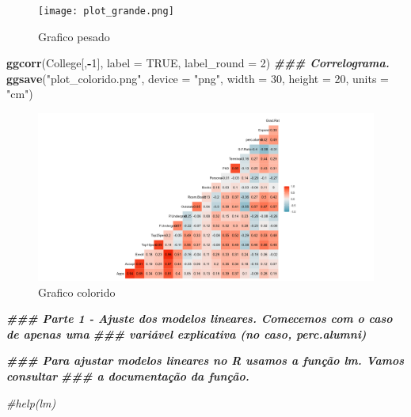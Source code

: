 \documentclass[
]{article}
\newenvironment{Shaded}{\begin{snugshade}}{\end{snugshade}}
\newcommand{\AttributeTok}[1]{\textcolor[rgb]{0.13,0.29,0.53}{#1}}
\newcommand{\CommentTok}[1]{\textcolor[rgb]{0.56,0.35,0.01}{\textit{#1}}}
\newcommand{\ConstantTok}[1]{\textcolor[rgb]{0.56,0.35,0.01}{#1}}
\newcommand{\DecValTok}[1]{\textcolor[rgb]{0.00,0.00,0.81}{#1}}
\newcommand{\DocumentationTok}[1]{\textcolor[rgb]{0.56,0.35,0.01}{\textbf{\textit{#1}}}}
\newcommand{\FunctionTok}[1]{\textcolor[rgb]{0.13,0.29,0.53}{\textbf{#1}}}
\newcommand{\NormalTok}[1]{#1}
\newcommand{\SpecialCharTok}[1]{\textcolor[rgb]{0.81,0.36,0.00}{\textbf{#1}}}
\newcommand{\StringTok}[1]{\textcolor[rgb]{0.31,0.60,0.02}{#1}}
\begin{document}
\begin{figure}
\centering
\texttt{[image: plot\_grande.png]}
\caption{Grafico pesado}
\end{figure}

\begin{Shaded}
\begin{Highlighting}[]
\FunctionTok{ggcorr}\NormalTok{(College[,}\SpecialCharTok{{-}}\DecValTok{1}\NormalTok{], }\AttributeTok{label =} \ConstantTok{TRUE}\NormalTok{, }\AttributeTok{label\_round =} \DecValTok{2}\NormalTok{) }\DocumentationTok{\#\#\# Correlograma.}
\FunctionTok{ggsave}\NormalTok{(}\StringTok{"plot\_colorido.png"}\NormalTok{, }\AttributeTok{device =} \StringTok{"png"}\NormalTok{, }\AttributeTok{width =} \DecValTok{30}\NormalTok{, }\AttributeTok{height =} \DecValTok{20}\NormalTok{, }\AttributeTok{units =} \StringTok{"cm"}\NormalTok{)}
\end{Highlighting}
\end{Shaded}

\begin{figure}
\centering
\includegraphics[width=1\textwidth,height=\textheight]{plot_colorido.png}
\caption{Grafico colorido}
\end{figure}

\begin{Shaded}
\begin{Highlighting}[]
\DocumentationTok{\#\#\# Parte 1 {-} Ajuste dos modelos lineares. Comecemos com o caso de apenas uma }
\DocumentationTok{\#\#\# variável explicativa (no caso, perc.alumni)}

\DocumentationTok{\#\#\# Para ajustar modelos lineares no R usamos a função lm. Vamos consultar}
\DocumentationTok{\#\#\# a documentação da função.}

\CommentTok{\#help(\textquotesingle{}lm\textquotesingle{})}
\end{Highlighting}
\end{Shaded}
\end{document}
